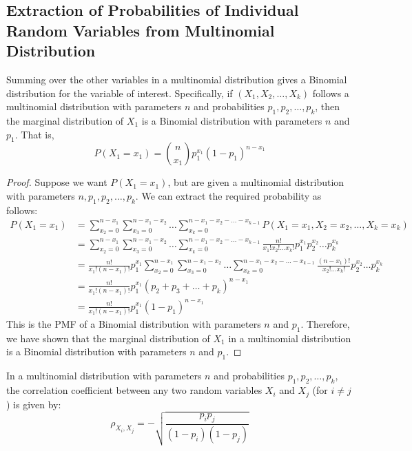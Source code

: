 \documentclass[openany]{book}
\begin{document}
\subsection{Extraction of Probabilities of Individual Random Variables from Multinomial Distribution}
\begin{mytheorem}
    Summing over the other variables in a multinomial distribution gives a Binomial distribution for the variable of interest. Specifically, if $(X_1, X_2, \ldots, X_k)$ follows a multinomial distribution with parameters $n$ and probabilities $p_1, p_2, \ldots, p_k$, then the marginal distribution of $X_1$ is a Binomial distribution with parameters $n$ and $p_1$. That is,
    $$P(X_1 = x_1) = \binom{n}{x_1} p_1^{x_1} (1 - p_1)^{n - x_1}$$
\end{mytheorem}
\begin{proof}
Suppose we want $P(X_1 = x_1)$, but are given a multinomial distribution with parameters $n, p_1, p_2, \ldots, p_k$. We can extract the required probability as follows:
\begin{align*}
    P(X_1 = x_1) &= \sum_{x_2=0}^{n-x_1} \sum_{x_3=0}^{n-x_1-x_2} \ldots \sum_{x_k=0}^{n - x_1 - x_2 - \ldots - x_{k-1}} P(X_1 = x_1, X_2 = x_2, \ldots, X_k = x_k) \\
    &= \sum_{x_2=0}^{n-x_1} \sum_{x_3=0}^{n-x_1-x_2} \ldots \sum_{x_k=0}^{n - x_1 - x_2 - \ldots - x_{k-1}} \frac{n!}{x_1! x_2! \ldots x_k!} p_1^{x_1} p_2^{x_2} \ldots p_k^{x_k} \\
    &= \frac{n!}{x_1! (n - x_1)!} p_1^{x_1} \sum_{x_2=0}^{n-x_1} \sum_{x_3=0}^{n-x_1-x_2} \ldots \sum_{x_k=0}^{n - x_1 - x_2 - \ldots - x_{k-1}} \frac{(n - x_1)!}{x_2! \ldots x_k!} p_2^{x_2} \ldots p_k^{x_k} \\
    &= \frac{n!}{x_1! (n - x_1)!} p_1^{x_1} (p_2 + p_3 + \ldots + p_k)^{n - x_1} \\
    &= \frac{n!}{x_1! (n - x_1)!} p_1^{x_1} (1 - p_1)^{n - x_1}
\end{align*}
This is the PMF of a Binomial distribution with parameters $n$ and $p_1$. Therefore, we have shown that the marginal distribution of $X_1$ in a multinomial distribution is a Binomial distribution with parameters $n$ and $p_1$.
\end{proof}
\begin{mytheorem}
    In a multinomial distribution with parameters $n$ and probabilities $p_1, p_2, \ldots, p_k$, the correlation coefficient between any two random variables $X_i$ and $X_j$ (for $i \neq j$) is given by:
    $$\rho_{X_i, X_j} = -\sqrt{\frac{p_i p_j}{(1 - p_i)(1 - p_j)}}$$
\end{mytheorem}
\end{document}
